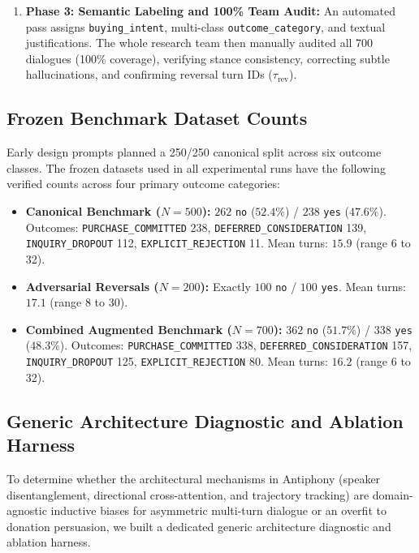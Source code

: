 \begin{enumerate}
  \item \textbf{Phase 3: Semantic Labeling and 100\% Team Audit:} An automated pass assigns \texttt{buying\_intent}, multi-class \texttt{outcome\_category}, and textual justifications. The whole research team then manually audited all 700 dialogues (100\% coverage), verifying stance consistency, correcting subtle hallucinations, and confirming reversal turn IDs ($\tau_{\text{rev}}$).
\end{enumerate}

\subsection{Frozen Benchmark Dataset Counts}
Early design prompts planned a 250/250 canonical split across six outcome classes. The frozen datasets used in all experimental runs have the following verified counts across four primary outcome categories:
\begin{itemize}
  \item \textbf{Canonical Benchmark ($N=500$):} $262$ \texttt{no} ($52.4\%$) / $238$ \texttt{yes} ($47.6\%$). Outcomes: \texttt{PURCHASE\_COMMITTED} 238, \texttt{DEFERRED\_CONSIDERATION} 139, \texttt{INQUIRY\_DROPOUT} 112, \texttt{EXPLICIT\_REJECTION} 11. Mean turns: $15.9$ (range 6 to 32).
  \item \textbf{Adversarial Reversals ($N=200$):} Exactly $100$ \texttt{no} / $100$ \texttt{yes}. Mean turns: $17.1$ (range 8 to 30).
  \item \textbf{Combined Augmented Benchmark ($N=700$):} $362$ \texttt{no} ($51.7\%$) / $338$ \texttt{yes} ($48.3\%$). Outcomes: \texttt{PURCHASE\_COMMITTED} 338, \texttt{DEFERRED\_CONSIDERATION} 157, \texttt{INQUIRY\_DROPOUT} 125, \texttt{EXPLICIT\_REJECTION} 80. Mean turns: $16.2$ (range 6 to 32).
\end{itemize}

\subsection{Generic Architecture Diagnostic and Ablation Harness}
\label{sec:diagnostic-ablation-harness}

To determine whether the architectural mechanisms in Antiphony (speaker disentanglement, directional cross-attention, and trajectory tracking) are domain-agnostic inductive biases for asymmetric multi-turn dialogue or an overfit to donation persuasion, we built a dedicated generic architecture diagnostic and ablation harness.

